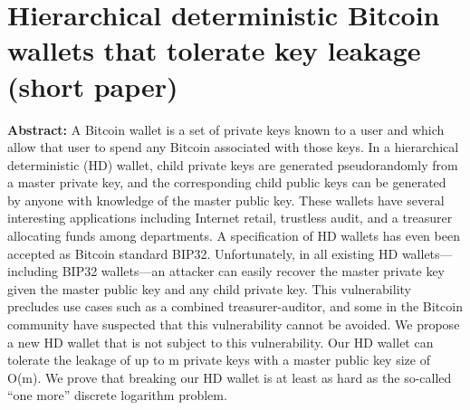 \section{Hierarchical deterministic Bitcoin wallets that tolerate key leakage (short paper)}

\textbf{Abstract:} 
A Bitcoin wallet is a set of private keys known to a user and which allow that user to spend any Bitcoin associated with those keys. In a hierarchical deterministic (HD) wallet, child private keys are generated pseudorandomly from a master private key, and the corresponding child public keys can be generated by anyone with knowledge of the master public key. These wallets have several interesting applications including Internet retail, trustless audit, and a treasurer allocating funds among departments. A specification of HD wallets has even been accepted as Bitcoin standard BIP32. Unfortunately, in all existing HD wallets—including BIP32 wallets—an attacker can easily recover the master private key given the master public key and any child private key. This vulnerability precludes use cases such as a combined treasurer-auditor, and some in the Bitcoin community have suspected that this vulnerability cannot be avoided. We propose a new HD wallet that is not subject to this vulnerability. Our HD wallet can tolerate the leakage of up to m private keys with a master public key size of O(m). We prove that breaking our HD wallet is at least as hard as the so-called “one more” discrete logarithm problem.
